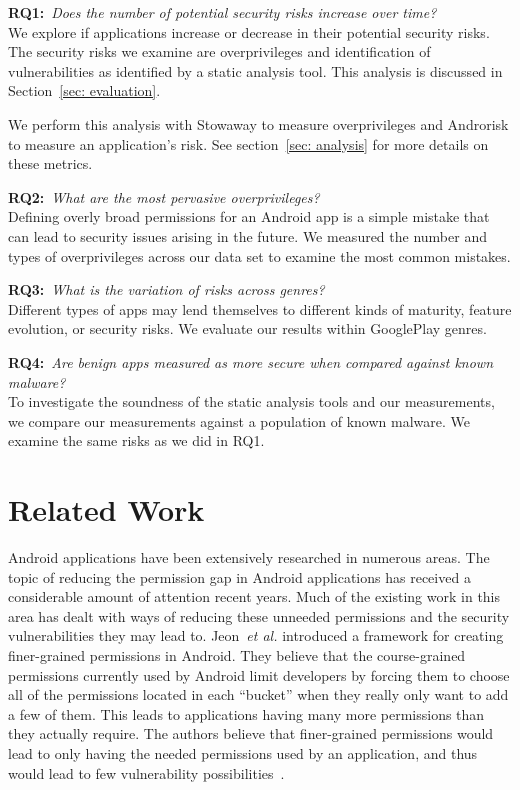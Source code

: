 \documentclass[conference]{IEEEtran}
\newcommand{\todo}[1]{\textcolor{cyan}{\textbf{[#1]}}}
\begin{document}
\textbf{RQ1:}~\emph{Does the number of potential security risks increase over time?}\\
We explore if applications increase or decrease in their potential security risks. The security risks we examine are overprivileges and identification of vulnerabilities as identified by a static analysis tool. This analysis is discussed in Section~\ref{sec: evaluation}.

We perform this analysis with Stowaway to measure overprivileges and Androrisk to measure an application's risk. See section~\ref{sec: analysis} for more details on these metrics.


\textbf{RQ2:}~\emph{What are the most pervasive overprivileges?}\\
Defining overly broad permissions for an Android app is a simple mistake that can lead to security issues arising in the future. We measured the number and types of overprivileges across our data set to examine the most common mistakes.

\textbf{RQ3:}~\emph{What is the variation of risks across genres?}\\
Different types of apps may lend themselves to different kinds of maturity, feature evolution, or security risks. We evaluate our results within GooglePlay genres.

\textbf{RQ4:}~\emph{Are benign apps measured as more secure when compared against known malware?}\\
To investigate the soundness of the static analysis tools and our measurements, we compare our measurements against a population of known malware. We examine the same risks as we did in RQ1.


\section{Related Work}
\label{sec: relatedwork}


Android applications have been extensively researched in numerous areas. The topic of reducing the permission gap in Android applications has received a considerable amount of attention recent years. Much of the existing work in this area has dealt with ways of reducing these unneeded permissions and the security vulnerabilities they may lead to. Jeon~\emph{et al.} introduced a framework for creating finer-grained permissions in Android. They believe that the course-grained permissions currently used by Android limit developers by forcing them to choose all of the permissions located in each ``bucket'' when they really only want to add a few of them. This leads to applications having many more permissions than they actually require. The authors believe that finer-grained permissions would lead to only having the needed permissions used by an application, and thus would lead to few vulnerability possibilities~\cite{jeon2011dr}.
\end{document}
